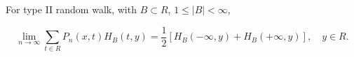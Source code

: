For type II random walk, with $B \subset R$, $1 \leq |B| < \infty$,

$$\lim_{n \to \infty} \sum_{t \in R} P_n(x,t)H_B(t,y) = \frac{1}{2}[H_B(-\infty,y) + H_B(+\infty,y)], \quad y \in R.$$